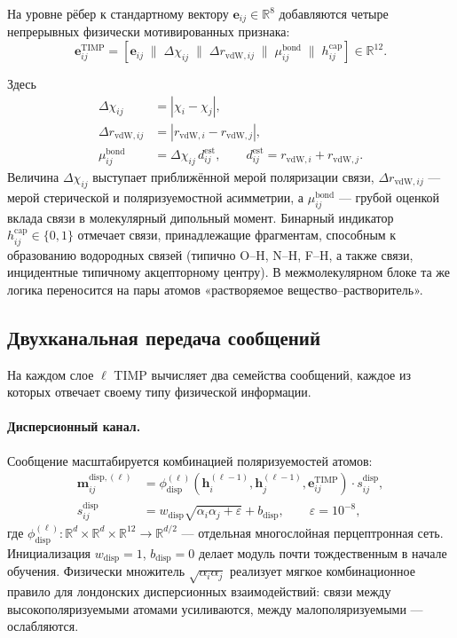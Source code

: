 \documentclass[11pt]{article}
\begin{document}
На уровне рёбер к стандартному вектору $\mathbf{e}_{ij}\in\mathbb{R}^8$ добавляются четыре непрерывных физически мотивированных признака:
\begin{equation*}
\mathbf{e}_{ij}^{\mathrm{TIMP}} = [\mathbf{e}_{ij} \;\|\; \Delta\chi_{ij} \;\|\; \Delta r_{\mathrm{vdW},ij} \;\|\; \mu_{ij}^{\mathrm{bond}} \;\|\; h_{ij}^{\mathrm{cap}}] \in \mathbb{R}^{12}.
\end{equation*}

Здесь
\begin{align*}
\Delta\chi_{ij} &= |\chi_i - \chi_j|, \\
\Delta r_{\mathrm{vdW},ij} &= |r_{\mathrm{vdW},i} - r_{\mathrm{vdW},j}|, \\
\mu_{ij}^{\mathrm{bond}} &= \Delta\chi_{ij}\, d_{ij}^{\mathrm{est}},
\qquad
d_{ij}^{\mathrm{est}} = r_{\mathrm{vdW},i} + r_{\mathrm{vdW},j}.
\end{align*}
Величина $\Delta\chi_{ij}$ выступает приближённой мерой поляризации связи, $\Delta r_{\mathrm{vdW},ij}$ --- мерой стерической и поляризуемостной асимметрии, а $\mu_{ij}^{\mathrm{bond}}$ --- грубой оценкой вклада связи в молекулярный дипольный момент. Бинарный индикатор $h_{ij}^{\mathrm{cap}}\in\{0,1\}$ отмечает связи, принадлежащие фрагментам, способным к образованию водородных связей (типично O--H, N--H, F--H, а также связи, инцидентные типичному акцепторному центру). В межмолекулярном блоке та же логика переносится на пары атомов «растворяемое вещество--растворитель».

\subsection{Двухканальная передача сообщений}

На каждом слое $\ell$ TIMP вычисляет два семейства сообщений, каждое из которых отвечает своему типу физической информации.

\paragraph{Дисперсионный канал.}
Сообщение масштабируется комбинацией поляризуемостей атомов:
\begin{align*}
\mathbf{m}_{ij}^{\mathrm{disp},(\ell)} &= \phi_{\mathrm{disp}}^{(\ell)}\!\left(\mathbf{h}_i^{(\ell-1)},\mathbf{h}_j^{(\ell-1)},\mathbf{e}_{ij}^{\mathrm{TIMP}}\right) \cdot s_{ij}^{\mathrm{disp}}, \\
s_{ij}^{\mathrm{disp}} &= w_{\mathrm{disp}}\sqrt{\alpha_i\alpha_j + \varepsilon} + b_{\mathrm{disp}},
\qquad \varepsilon = 10^{-8},
\end{align*}
где $\phi_{\mathrm{disp}}^{(\ell)}: \mathbb{R}^{d}\times\mathbb{R}^{d}\times\mathbb{R}^{12}\to\mathbb{R}^{d/2}$ --- отдельная многослойная перцептронная сеть. Инициализация $w_{\mathrm{disp}}=1$, $b_{\mathrm{disp}}=0$ делает модуль почти тождественным в начале обучения. Физически множитель $\sqrt{\alpha_i\alpha_j}$ реализует мягкое комбинационное правило для лондонских дисперсионных взаимодействий: связи между высокополяризуемыми атомами усиливаются, между малополяризуемыми --- ослабляются.
\end{document}
